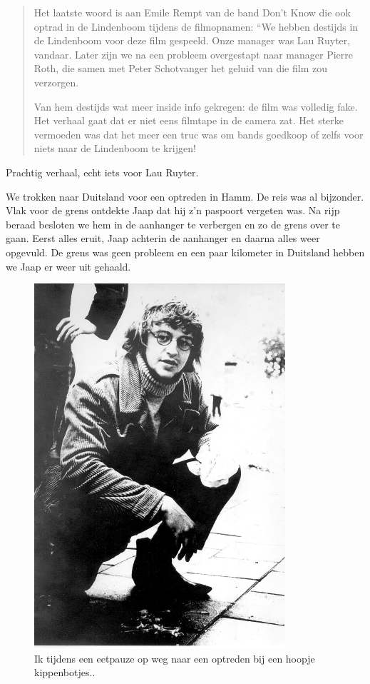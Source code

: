 \documentclass[12pt,twoside, openright]{memoir}
\begin{document}
\begin{quote}
Het laatste woord is aan Emile Rempt van de band Don’t Know die ook optrad in de Lindenboom tijdens de filmopnamen: “We hebben destijds in de Lindenboom voor deze film gespeeld. Onze manager was Lau Ruyter, vandaar. Later zijn we na een probleem overgestapt naar manager Pierre Roth, die samen met Peter Schotvanger het geluid van die film zou verzorgen.

Van hem destijds wat meer inside info gekregen: de film was volledig fake. Het verhaal gaat dat er niet eens filmtape in de camera zat. Het sterke vermoeden was dat het meer een truc was om bands goedkoop of zelfs voor niets naar de Lindenboom te krijgen!
\end{quote}

Prachtig verhaal, echt iets voor Lau Ruyter.

We trokken naar Duitsland voor een optreden in Hamm. De reis was al bijzonder. Vlak voor de grens ontdekte Jaap dat hij z’n paspoort vergeten was. Na rijp beraad besloten we hem in de aanhanger te verbergen en zo de grens over te gaan. Eerst alles eruit, Jaap achterin de aanhanger en daarna alles weer opgevuld. De grens was geen probleem en een paar kilometer in Duitsland hebben we Jaap er weer uit gehaald. 

\begin{figure}
\includegraphics[width=\textwidth]{img/ch30/optourneeAs}
\caption*{\footnotesize Ik tijdens een eetpauze op weg naar een optreden bij een hoopje kippenbotjes..}
\end{figure}
\end{document}
